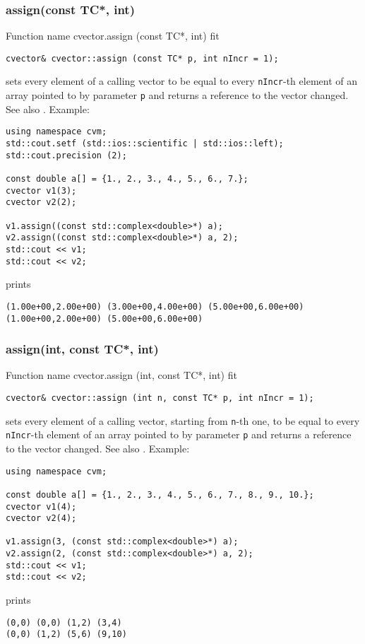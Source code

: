 \subsubsection{assign(const TC*, int)}
Function%
\pdfdest name {cvector.assign (const TC*, int)} fit
\begin{verbatim}
cvector& cvector::assign (const TC* p, int nIncr = 1);
\end{verbatim}
sets every element of a calling vector to be equal to
every \verb"nIncr"-th element of an array  pointed to by parameter \verb"p"
and returns a reference to the vector changed.
See also .
Example:
\begin{Verbatim}
using namespace cvm;
std::cout.setf (std::ios::scientific | std::ios::left);
std::cout.precision (2);

const double a[] = {1., 2., 3., 4., 5., 6., 7.};
cvector v1(3);
cvector v2(2);

v1.assign((const std::complex<double>*) a);
v2.assign((const std::complex<double>*) a, 2);
std::cout << v1;
std::cout << v2;
\end{Verbatim}
prints
\begin{Verbatim}
(1.00e+00,2.00e+00) (3.00e+00,4.00e+00) (5.00e+00,6.00e+00)
(1.00e+00,2.00e+00) (5.00e+00,6.00e+00)
\end{Verbatim}
\newpage




\subsubsection{assign(int, const TC*, int)}
Function%
\pdfdest name {cvector.assign (int, const TC*, int)} fit
\begin{verbatim}
cvector& cvector::assign (int n, const TC* p, int nIncr = 1);
\end{verbatim}
sets every element of a calling vector, starting from \Based \verb"n"-th one,
to be equal to
every \verb"nIncr"-th element of an array  pointed to by parameter \verb"p"
and returns a reference to the vector changed.
See also .
Example:
\begin{Verbatim}
using namespace cvm;

const double a[] = {1., 2., 3., 4., 5., 6., 7., 8., 9., 10.};
cvector v1(4);
cvector v2(4);

v1.assign(3, (const std::complex<double>*) a);
v2.assign(2, (const std::complex<double>*) a, 2);
std::cout << v1;
std::cout << v2;
\end{Verbatim}
prints
\begin{Verbatim}
(0,0) (0,0) (1,2) (3,4)
(0,0) (1,2) (5,6) (9,10)
\end{Verbatim}
\newpage



